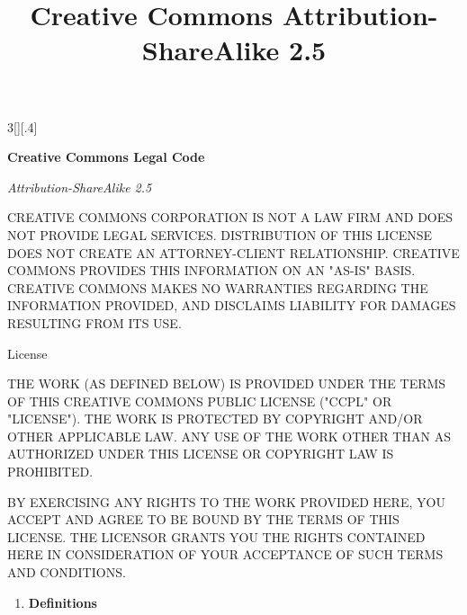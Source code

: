 \documentclass[8pt,a4paper]{article}
\title{Creative Commons Attribution-ShareAlike 2.5}
\begin{document}
%

\begin{multicols}{3}[][.4\paperwidth]%
 {%

  \textbf{Creative Commons Legal Code}
  \smallskip 

  \emph{Attribution-ShareAlike 2.5}
  \smallskip

  CREATIVE COMMONS CORPORATION IS NOT A LAW FIRM AND DOES NOT PROVIDE LEGAL
  SERVICES. DISTRIBUTION OF THIS LICENSE DOES NOT CREATE AN ATTORNEY-CLIENT
  RELATIONSHIP. CREATIVE COMMONS PROVIDES THIS INFORMATION ON AN "AS-IS" BASIS.
  CREATIVE COMMONS MAKES NO WARRANTIES REGARDING THE INFORMATION PROVIDED, AND
  DISCLAIMS LIABILITY FOR DAMAGES RESULTING FROM ITS USE.

 \medskip
  License
 \smallskip

  THE WORK (AS DEFINED BELOW) IS PROVIDED UNDER THE TERMS OF THIS CREATIVE
  COMMONS PUBLIC LICENSE ("CCPL" OR "LICENSE"). THE WORK IS PROTECTED BY
  COPYRIGHT AND/OR OTHER APPLICABLE LAW. ANY USE OF THE WORK OTHER THAN AS
  AUTHORIZED UNDER THIS LICENSE OR COPYRIGHT LAW IS PROHIBITED.

  BY EXERCISING ANY RIGHTS TO THE WORK PROVIDED HERE, YOU ACCEPT AND AGREE
  TO BE BOUND BY THE TERMS OF THIS LICENSE. THE LICENSOR GRANTS YOU THE
  RIGHTS CONTAINED HERE IN CONSIDERATION OF YOUR ACCEPTANCE OF SUCH TERMS
  AND CONDITIONS.

}

\bigskip

\begin{enumerate}

  \item \textbf{Definitions}

  \begin{enumerate}


\end{enumerate}
\end{enumerate}
\end{multicols}
\end{document}

